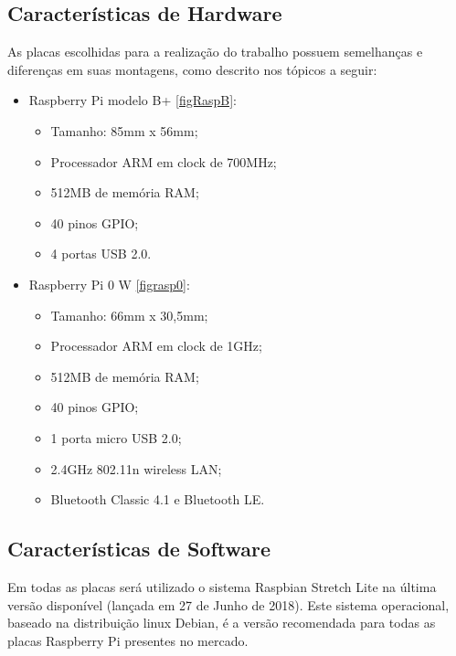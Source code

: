 \subsection{Características de Hardware}
\quad As placas escolhidas para a realização do trabalho possuem semelhanças e diferenças em suas montagens, como descrito nos tópicos a seguir:
\begin{itemize}
  \item Raspberry Pi modelo B+ \ref{figRaspB}:
  \begin{itemize}
    \item Tamanho: 85mm x 56mm;
    \item Processador ARM em clock de 700MHz;
    \item 512MB de memória RAM;
    \item 40 pinos GPIO;
    \item 4 portas USB 2.0.
  \end{itemize}
  \item Raspberry Pi 0 W \ref{figrasp0}:
  \begin{itemize}
    \item Tamanho: 66mm x 30,5mm;
    \item Processador ARM em clock de 1GHz;
    \item 512MB de memória RAM;
    \item 40 pinos GPIO;
    \item 1 porta micro USB 2.0;
    \item 2.4GHz 802.11n wireless LAN;
    \item Bluetooth Classic 4.1 e Bluetooth LE.
  \end{itemize}
\end{itemize}
\subsection{Características de Software}
\quad Em todas as placas será utilizado o sistema Raspbian Stretch Lite na última versão disponível (lançada em 27 de Junho de 2018).
Este sistema operacional, baseado na distribuição linux Debian, é a versão recomendada para todas as placas Raspberry Pi presentes no mercado.
